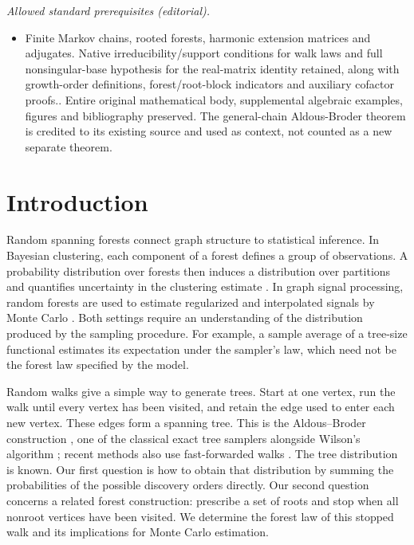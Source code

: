 \documentclass[onefignum,onetabnum,nohypdvips]{siamart250211}
\numberwithin{theorem}{section}
\numberwithin{equation}{section}
\begin{document}
\noindent\textit{Allowed standard prerequisites (editorial).}\begin{itemize}
\item Finite Markov chains, rooted forests, harmonic extension matrices and adjugates. Native irreducibility/support conditions for walk laws and full nonsingular-base hypothesis for the real-matrix identity retained, along with growth-order definitions, forest/root-block indicators and auxiliary cofactor proofs.. Entire original mathematical body, supplemental algebraic examples, figures and bibliography preserved. The general-chain Aldous-Broder theorem is credited to its existing source and used as context, not counted as a new separate theorem.
\end{itemize}\medskip
\section{Introduction}\label{sec:intro}

Random spanning forests connect graph structure to statistical
inference. In Bayesian clustering, each component of a forest defines
a group of observations. A probability distribution over forests then
induces a distribution over partitions and quantifies uncertainty in
the clustering estimate \cite{LuoSangMallick2021,DuanRoy2024}. In graph
signal processing, random forests are used to estimate regularized and
interpolated signals by Monte Carlo
\cite{PilavciAmblardBarthelmeTremblay2021}. Both settings require an
understanding of the distribution produced by the sampling procedure.
For example, a sample average of a tree-size functional estimates its
expectation under the sampler's law, which need not be the forest law
specified by the model.

Random walks give a simple way to generate trees. Start at one vertex,
run the walk until every vertex has been visited, and retain the edge
used to enter each new vertex. These edges form a spanning tree. This
is the Aldous--Broder construction \cite{Broder1989,Aldous1990}, one of
the classical exact tree samplers alongside Wilson's algorithm
\cite{Wilson1996,ProppWilson1998}; recent methods also use
fast-forwarded walks \cite{TamDunsonDuan2025}. The tree distribution is
known. Our first question is how to obtain that distribution by
summing the probabilities of the possible discovery orders directly.
Our second question concerns a related forest construction: prescribe
a set of roots and stop when all nonroot vertices have been visited.
We determine the forest law of this stopped walk and its implications
for Monte Carlo estimation.
\end{document}
